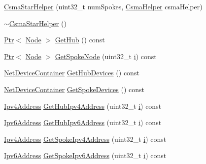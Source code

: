 \begin{DoxyCompactItemize}
\item 
\hyperlink{classns3_1_1CsmaStarHelper_a56616edc9c41752e14a4c9626f178b19}{Csma\+Star\+Helper} (uint32\+\_\+t num\+Spokes, \hyperlink{classns3_1_1CsmaHelper}{Csma\+Helper} csma\+Helper)
\item 
\hyperlink{classns3_1_1CsmaStarHelper_a68f3c896e1eb15223ecdbeabb618ffe3}{$\sim$\+Csma\+Star\+Helper} ()
\item 
\hyperlink{classns3_1_1Ptr}{Ptr}$<$ \hyperlink{classns3_1_1Node}{Node} $>$ \hyperlink{classns3_1_1CsmaStarHelper_ae3b29788030e12d6dfb73e2907d7a78a}{Get\+Hub} () const 
\item 
\hyperlink{classns3_1_1Ptr}{Ptr}$<$ \hyperlink{classns3_1_1Node}{Node} $>$ \hyperlink{classns3_1_1CsmaStarHelper_ac58602f4a6ad4c246d7927abff84ebc7}{Get\+Spoke\+Node} (uint32\+\_\+t \hyperlink{lte__uplink__power__control_8m_a6f6ccfcf58b31cb6412107d9d5281426}{i}) const 
\item 
\hyperlink{classns3_1_1NetDeviceContainer}{Net\+Device\+Container} \hyperlink{classns3_1_1CsmaStarHelper_ad3ed17efc0c6125d6b43527d237ceff4}{Get\+Hub\+Devices} () const 
\item 
\hyperlink{classns3_1_1NetDeviceContainer}{Net\+Device\+Container} \hyperlink{classns3_1_1CsmaStarHelper_a10985e2182ba3cd83a922546d2b815b1}{Get\+Spoke\+Devices} () const 
\item 
\hyperlink{classns3_1_1Ipv4Address}{Ipv4\+Address} \hyperlink{classns3_1_1CsmaStarHelper_a62acad53adf8c3311f579e2db1950269}{Get\+Hub\+Ipv4\+Address} (uint32\+\_\+t \hyperlink{lte__uplink__power__control_8m_a6f6ccfcf58b31cb6412107d9d5281426}{i}) const 
\item 
\hyperlink{classns3_1_1Ipv6Address}{Ipv6\+Address} \hyperlink{classns3_1_1CsmaStarHelper_a1fdcf34290d4cfd6ca980d16cb0b4943}{Get\+Hub\+Ipv6\+Address} (uint32\+\_\+t \hyperlink{lte__uplink__power__control_8m_a6f6ccfcf58b31cb6412107d9d5281426}{i}) const 
\item 
\hyperlink{classns3_1_1Ipv4Address}{Ipv4\+Address} \hyperlink{classns3_1_1CsmaStarHelper_a4e02b97607c6200c7b1013bb30252d30}{Get\+Spoke\+Ipv4\+Address} (uint32\+\_\+t \hyperlink{lte__uplink__power__control_8m_a6f6ccfcf58b31cb6412107d9d5281426}{i}) const 
\item 
\hyperlink{classns3_1_1Ipv6Address}{Ipv6\+Address} \hyperlink{classns3_1_1CsmaStarHelper_ab63d72dff486c0e0a041d3f4df19328a}{Get\+Spoke\+Ipv6\+Address} (uint32\+\_\+t \hyperlink{lte__uplink__power__control_8m_a6f6ccfcf58b31cb6412107d9d5281426}{i}) const 

\end{DoxyCompactItemize}
